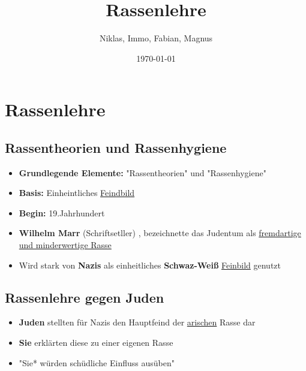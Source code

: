 \documentclass{article}
\author{Niklas, Immo, Fabian, Magnus}
\date{\today}
\title{Rassenlehre}
\begin{document}
\maketitle
\setcounter{tocdepth}{1}
\tableofcontents



\section{Rassenlehre}
\label{sec:org76cbb41}
\subsection{Rassentheorien und Rassenhygiene}
\label{sec:orgb58f102}
\begin{itemize}
\item \textbf{Grundlegende Elemente:} "Rassentheorien" und "Rassenhygiene"
\item \textbf{Basis:} Einheintliches \uline{Feindbild}
\item \textbf{Begin:} 19.Jahrhundert
\item \textbf{Wilhelm Marr} (Schriftsetller) , bezeichnette das Judentum als \uline{fremdartige und minderwertige Rasse}
\item Wird stark von \textbf{Nazis} als einheitliches \textbf{Schwaz-Weiß} \uline{Feinbild} genutzt
\end{itemize}

\subsection{Rassenlehre gegen Juden}
\label{sec:org15a780d}
\begin{itemize}
\item \textbf{Juden} stellten für Nazis den Hauptfeind der \uline{arischen} Rasse dar
\item \textbf{Sie} erklärten diese zu einer eigenen Rasse
\item "Sie* würden schüdliche Einfluss ausüben"
\end{itemize}
\end{document}
